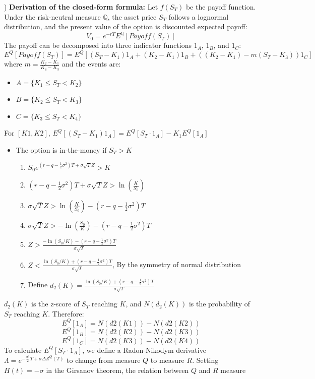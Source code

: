 \documentclass[DIN, pagenumber=false, fontsize=11pt, parskip=half]{scrartcl}
\newcommand{\mysubsection}[2]{\romannumeral #1) #2}
\begin{document}
\mysubsection{1}{
	\textbf{Derivation of the closed-form formula:} Let $f(S_T)$ be the payoff function. Under the risk-neutral measure $\mathbb{Q}$,
	the asset price $S_T$ follows a lognormal distribution, and the present value of the option is discounted expected payoff:
	$$V_0 = e^{-rT}E^\mathbb{Q}[Payoff(S_T)]$$
	The payoff can be decomposed into three indicator functions $1_{A}$, $1_{B}$, and $1_{C}$:
	$$E^Q[Payoff(S_T)] = E^Q[(S_T - K_1)1_A + (K_2 - K_1)1_B + ((K_2 - K_1) - m(S_T - K_3))1_C]$$
	where $m = \frac{K_2 - K_1}{K_4 - K_3}$ and the events are:
	\begin{itemize}
		\item $A = \{K_1 \leq S_T < K_2\}$
		\item $B = \{K_2 \leq S_T < K_3\}$
		\item $C = \{K_3 \leq S_T < K_4\}$
	\end{itemize}
	For $[K1, K2]$, $E^Q[(S_T - K_1)1_A] = E^Q[S_T \cdot 1_A] - K_1E^Q[1_A]$
	\begin{itemize}
		\item The option is in-the-money if $S_T > K$
			\begin{enumerate}
				\item $S_0e^{(r-q-\frac{1}{2}\sigma^2)T + \sigma\sqrt{T}Z} > K$
				\item $(r-q-\frac{1}{2}\sigma^2)T + \sigma\sqrt{T}Z > \ln\left(\frac{K}{S_0}\right)$
				\item $\sigma\sqrt{T}Z > \ln\left(\frac{K}{S_0}\right) - (r-q-\frac{1}{2}\sigma^2)T$
				\item $\sigma\sqrt{T}Z > -\ln\left(\frac{S_0}{K}\right) - (r-q-\frac{1}{2}\sigma^2)T$
				\item $Z > \frac{-\ln(S_0/K) - (r-q-\frac{1}{2}\sigma^2)T}{\sigma\sqrt{T}}$
				\item $Z < \frac{\ln(S_0/K) + (r-q-\frac{1}{2}\sigma^2)T}{\sigma\sqrt{T}}$, By the symmetry of normal distribution
				\item Define $d_2(K) = \frac{\ln(S_0/K) + (r-q-\frac{1}{2}\sigma^2)T}{\sigma\sqrt{T}}$
			\end{enumerate}
	\end{itemize}
	$d_2(K)$ is the z-score of $S_T$ reaching $K$, and $N(d_2(K))$ is the probability of $S_T$ reaching $K$. Therefore:
	$$E^Q[1_A] = N(d2(K1)) - N(d2(K2))$$
	$$E^Q[1_B] = N(d2(K2)) - N(d2(K3))$$
	$$E^Q[1_C] = N(d2(K3)) - N(d2(K4))$$
	To calculate $E^Q[S_T \cdot 1_A]$, we define a Radon-Nikodym derivative $\Lambda = e^{-\frac{\sigma^2}{2}T + \sigma \Delta Z^Q(T)}$ to 
	change from measure $Q$ to measure $R$. Setting $H(t) = -\sigma$ in the Girsanov theorem, the relation between $Q$ and $R$ measure
}
\end{document}

